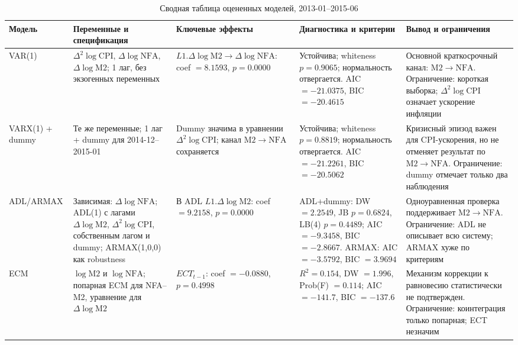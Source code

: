 \documentclass[12pt,a4paper]{article}
\renewcommand{\arraystretch}{1.2}
\begin{document}
\begin{table}[H]
\centering
\caption{Сводная таблица оцененных моделей, 2013-01--2015-06}
\scriptsize
\renewcommand{\arraystretch}{1.08}
\setlength{\tabcolsep}{3pt}
\begin{adjustbox}{max width=\linewidth}
\begin{tabularx}{\linewidth}{p{2.1cm} Y Y Y Y}
\toprule
Модель & Переменные и спецификация & Ключевые эффекты & Диагностика и критерии & Вывод и ограничения \\
\midrule
VAR(1) &
$\Delta^2 \log \mathrm{CPI}$, $\Delta \log \mathrm{NFA}$, $\Delta \log \mathrm{M2}$; 1 лаг, без экзогенных переменных &
$L1.\Delta \log \mathrm{M2} \to \Delta \log \mathrm{NFA}$: coef $=8.1593$, $p=0.0000$ &
Устойчива; whiteness $p=0.9065$; нормальность отвергается. AIC $=-21.0375$, BIC $=-20.4615$ &
Основной краткосрочный канал: $\mathrm{M2} \to \mathrm{NFA}$. Ограничение: короткая выборка; $\Delta^2 \log \mathrm{CPI}$ означает ускорение инфляции \\
\addlinespace
VARX(1) + dummy &
Те же переменные; 1 лаг + dummy для 2014-12--2015-01 &
Dummy значима в уравнении $\Delta^2 \log \mathrm{CPI}$; канал $\mathrm{M2} \to \mathrm{NFA}$ сохраняется &
Устойчива; whiteness $p=0.8819$; нормальность отвергается. AIC $=-21.2261$, BIC $=-20.5062$ &
Кризисный эпизод важен для CPI-ускорения, но не отменяет результат по $\mathrm{M2} \to \mathrm{NFA}$. Ограничение: dummy отмечает только два наблюдения \\
\addlinespace
ADL/ARMAX &
Зависимая: $\Delta \log \mathrm{NFA}$; ADL(1) с лагами $\Delta \log \mathrm{M2}$, $\Delta^2 \log \mathrm{CPI}$, собственным лагом и dummy; ARMAX(1,0,0) как robustness &
В ADL $L1.\Delta \log \mathrm{M2}$: coef $=9.2158$, $p=0.0000$ &
ADL+dummy: DW $=2.2549$, JB $p=0.6824$, LB(4) $p=0.4489$; AIC $=-9.3458$, BIC $=-2.8667$. ARMAX: AIC $=-3.5792$, BIC $=3.9694$ &
Одноуравненная проверка поддерживает $\mathrm{M2} \to \mathrm{NFA}$. Ограничение: ADL не описывает всю систему; ARMAX хуже по критериям \\
\addlinespace
ECM &
$\log \mathrm{M2}$ и $\log \mathrm{NFA}$; попарная ECM для NFA--M2, уравнение для $\Delta \log \mathrm{M2}$ &
$ECT_{t-1}$: coef $=-0.0880$, $p=0.4998$ &
$R^2=0.154$, DW $=1.996$, Prob(F) $=0.114$; AIC $=-141.7$, BIC $=-137.6$ &
Механизм коррекции к равновесию статистически не подтвержден. Ограничение: коинтеграция только попарная; ECT незначим \\
\bottomrule
\end{tabularx}
\end{adjustbox}
\normalsize
\end{table}
\end{document}
